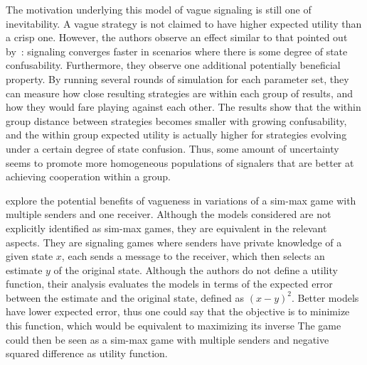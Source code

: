\documentclass[a4paper]{article}
\begin{document}
The motivation underlying this model of vague signaling is still one of inevitability.
A vague strategy is not claimed to have higher expected utility than a crisp one.
However, the authors observe an effect similar to that pointed out by~\citeauthor{oconnor_evolution_2014}: signaling converges faster in scenarios where there is some degree of state confusability.
Furthermore, they observe one additional potentially beneficial property.
By running several rounds of simulation for each parameter set, they can measure how close resulting strategies are within each group of results, and how they would fare playing against each other.
The results show that the within group distance between strategies becomes smaller with growing confusability, and the within group expected utility is actually higher for strategies evolving under a certain degree of state confusion.
Thus, some amount of uncertainty seems to promote more homogeneous populations of signalers that are better at achieving cooperation within a group.

\textcite{lawry_vagueness_2017} explore the potential benefits of vagueness in variations of a sim-max game with multiple senders and one receiver.
Although the models considered are not explicitly identified as sim-max games, they are equivalent in the relevant aspects.
They are signaling games where senders have private knowledge of a given state $x$, each sends a message to the receiver, which then selects an estimate $y$ of the original state.
Although the authors do not define a utility function, their analysis evaluates the models in terms of the expected error between the estimate and the original state, defined as $(x-y)^2$.
Better models have lower expected error, thus one could say that the objective is to minimize this function, which would be equivalent to maximizing its inverse
The game could then be seen as a sim-max game with multiple senders and negative squared difference as utility function.
\end{document}
